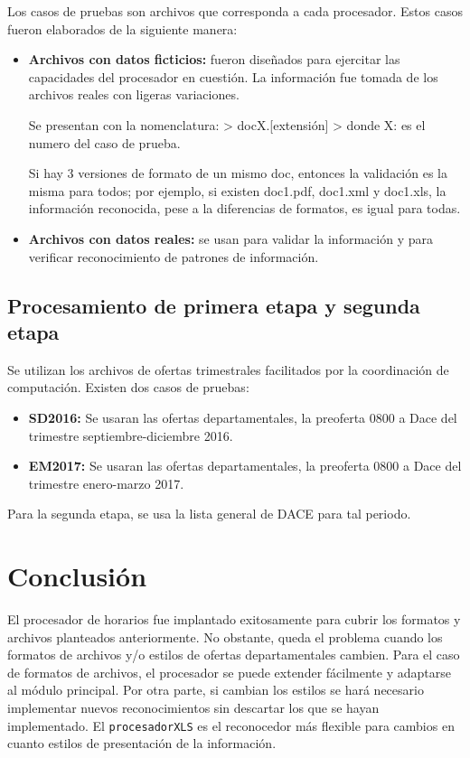 \documentclass[]{article}
\begin{document}
Los casos de pruebas son archivos que corresponda a cada procesador.
Estos casos fueron elaborados de la siguiente manera:

\begin{itemize}
\item
  \textbf{Archivos con datos ficticios:} fueron diseñados para ejercitar
  las capacidades del procesador en cuestión. La información fue tomada
  de los archivos reales con ligeras variaciones.

  Se presentan con la nomenclatura: \textgreater{} docX.{[}extensión{]}
  \textgreater{} donde X: es el numero del caso de prueba.

  Si hay 3 versiones de formato de un mismo doc, entonces la validación
  es la misma para todos; por ejemplo, si existen doc1.pdf, doc1.xml y
  doc1.xls, la información reconocida, pese a la diferencias de
  formatos, es igual para todas.
\item
  \textbf{Archivos con datos reales:} se usan para validar la
  información y para verificar reconocimiento de patrones de
  información.
\end{itemize}

\subsection{Procesamiento de primera etapa y segunda
etapa}\label{procesamiento-de-primera-etapa-y-segunda-etapa}

Se utilizan los archivos de ofertas trimestrales facilitados por la
coordinación de computación. Existen dos casos de pruebas:

\begin{itemize}
\item
  \textbf{SD2016:} Se usaran las ofertas departamentales, la preoferta
  0800 a Dace del trimestre septiembre-diciembre 2016.
\item
  \textbf{EM2017:} Se usaran las ofertas departamentales, la preoferta
  0800 a Dace del trimestre enero-marzo 2017.
\end{itemize}

Para la segunda etapa, se usa la lista general de DACE para tal periodo.

\section{Conclusión}\label{conclusiuxf3n}

El procesador de horarios fue implantado exitosamente para cubrir los
formatos y archivos planteados anteriormente. No obstante, queda el
problema cuando los formatos de archivos y/o estilos de ofertas
departamentales cambien. Para el caso de formatos de archivos, el
procesador se puede extender fácilmente y adaptarse al módulo principal.
Por otra parte, si cambian los estilos se hará necesario implementar
nuevos reconocimientos sin descartar los que se hayan implementado. El
\texttt{procesadorXLS} es el reconocedor más flexible para cambios en
cuanto estilos de presentación de la información.
\end{document}
